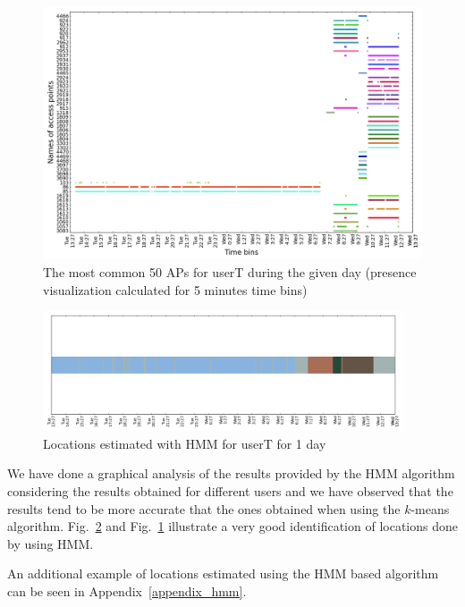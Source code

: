 \begin{figure}[!h]
\centering
\includegraphics[width=\textwidth]{figures/hmm/user_1_sorted_1days_no_rssi_plot.png}
\caption{The most common 50 APs for userT during the given day (presence
visualization calculated for 5 minutes time bins)}
\label{user_6_days1_2_3_APs_presence}
\end{figure}

\begin{figure}[!h]
\centering
\includegraphics[width=0.95\textwidth]{figures/hmm/user_1_hmm_locations_(5)_1days_plot.png}
\caption{Locations estimated with HMM for userT for 1 day}
\label{user_6_days1_2_3_hmm}
\end{figure}

We have done a graphical analysis of the results provided by the HMM algorithm
considering the results obtained for different users and we have observed that
the results tend to be more accurate that the ones obtained when using the
$k$-means algorithm. Fig.~\ref{user_6_days1_2_3_hmm} and
Fig.~\ref{user_6_days1_2_3_APs_presence} illustrate a very good identification
of locations done by using HMM.

An additional example of locations estimated using the HMM based algorithm can
be seen in Appendix~\ref{appendix_hmm}.